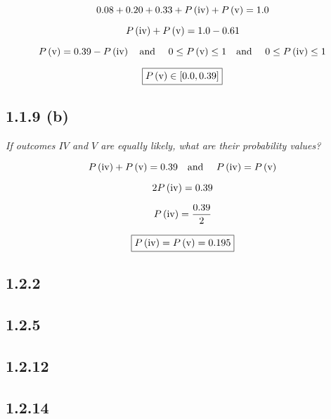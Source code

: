 \documentclass{article}
\begin{document}
\[
0.08 +
0.20 +
0.33 +
P\left(\textrm{\romannumeral 4}\right) +
P\left(\textrm{\romannumeral 5}\right) =
1.0
\]

\[
P\left(\textrm{\romannumeral 4}\right) +
P\left(\textrm{\romannumeral 5}\right) =
1.0 -
0.61
\]

\[
P\left(\textrm{\romannumeral 5}\right) =
0.39 -
P\left(\textrm{\romannumeral 4}\right)
\textrm{\quad and \quad}
0 \le P\left(\textrm{\romannumeral 5}\right) \le 1
\textrm{\quad and \quad}
0 \le P\left(\textrm{\romannumeral 4}\right) \le 1
\]

\[
\boxed{P\left(\textrm{\romannumeral 5}\right) \in \left[0.0, 0.39\right]}
\]

\subsection*{1.1.9 (b)}

\textit{If outcomes $IV$ and $V$ are equally likely, what are their probability values?}

\[
P\left(\textrm{\romannumeral 4}\right) +
P\left(\textrm{\romannumeral 5}\right) =
0.39
\text{\quad and \quad}
P\left(\textrm{\romannumeral 4}\right) =
P\left(\textrm{\romannumeral 5}\right)
\]

\[
2 P\left(\textrm{\romannumeral 4}\right) =
0.39
\]

\[
P\left(\textrm{\romannumeral 4}\right) = \frac{0.39}{2}
\]

\[
\boxed{
P\left(\textrm{\romannumeral 4}\right) =
P\left(\textrm{\romannumeral 5}\right) =
0.195
}
\]

\subsection*{1.2.2}



\subsection*{1.2.5}



\subsection*{1.2.12}



\subsection*{1.2.14}
\end{document}
